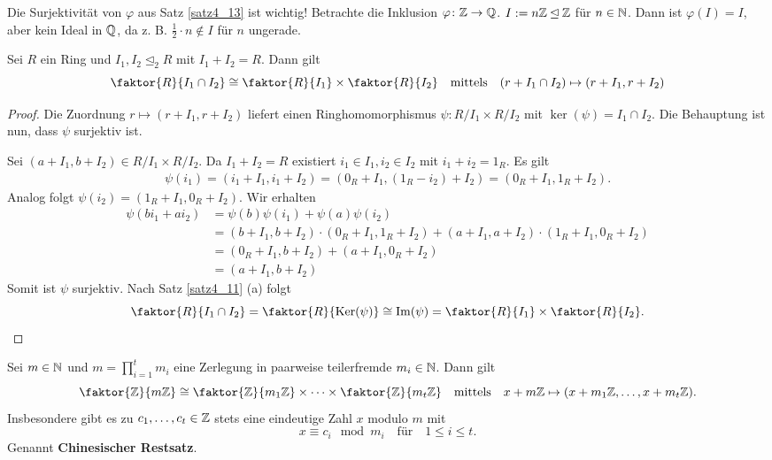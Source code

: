 \begin{rem}\label{rem4_14}
	Die Surjektivität von $\varphi$ aus Satz \ref{satz4_13} ist wichtig! Betrachte die Inklusion $\varphi \colon \mathbb{Z} \to \mathbb{Q}$. $I := n\mathbb{Z} \unlhd \mathbb{Z}$ für $n \in \mathbb{N}$. Dann ist $\varphi(I) = I$, aber kein Ideal in $\mathbb{Q}$, da z. B. $\frac{1}{2} \cdot n \notin I$ für $n$ ungerade.
\end{rem}

\begin{satz}\label{satz4_15}
	Sei $R$ ein Ring und $I_1, I_2 \unlhd_2 R$ mit $I_1 + I_2 = R$. Dann gilt
	\[\faktor{R}{I_1 \cap I_2} \cong \faktor{R}{I_1} \times \faktor{R}{I_2} \quad\text{mittels}\quad (r + I_1 \cap I_2) \mapsto (r+I_1, r+I_2)\]
\end{satz}
\begin{proof}
	Die Zuordnung $r \mapsto (r + I_1, r + I_2)$ liefert einen Ringhomomorphismus $\psi \colon R/I_1 \times R/I_2$ mit $\ker(\psi) = I_1 \cap I_2$. Die Behauptung ist nun, dass $\psi$ surjektiv ist.
	
	Sei $(a+I_1,b+I_2) \in R/I_1 \times R/I_2$. Da $I_1 + I_2 = R$ existiert $i_1 \in I_1, i_2 \in I_2$ mit $i_1 + i_2 = 1_R$. Es gilt
	\begin{align*}
		\psi(i_1) = (i_1 + I_1, i_1 + I_2) = (0_R + I_1, (1_R - i_2) + I_2) = (0_R + I_1, 1_R + I_2).
	\end{align*}
	Analog folgt $\psi(i_2) = (1_R + I_1, 0_R + I_2)$.  Wir erhalten
	\begin{align*}
		\psi(b{i_1} + a{i_2}) &= \psi(b)\psi(i_1) + \psi(a)\psi(i_2)\\ 
		&= (b+I_1, b+I_2)\cdot(0_R + I_1, 1_R + I_2) + (a+I_1, a + I_2)\cdot(1_R + I_1, 0_R +I_2)\\
		&= (0_R + I_1, b+I_2) + (a + I_1, 0_R + I_2) \\
		&= (a + I_1, b+I_2)
	\end{align*}
	Somit ist $\psi$ surjektiv. Nach Satz \ref{satz4_11} (a) folgt
	\[\faktor{R}{I_1 \cap I_2} = \faktor{R}{\ker(\psi)} \cong \im(\psi)  = \faktor{R}{I_1} \times \faktor{R}{I_2}.\]
\end{proof}
\begin{kor}\label{kor4_16}
	Sei $m \in \mathbb{N}$ und $m = \prod_{i=1}^t m_i$ eine Zerlegung in paarweise teilerfremde $m_i \in \mathbb{N}$. Dann gilt
	\[\faktor{\Z}{m\Z} \cong \faktor{\Z}{m_1 \Z} \times \dots \times \faktor{\Z}{m_t \Z} \quad\text{mittels}\quad x + m\Z \mapsto (x+m_1\Z, \dots, x+m_t \Z).\]
	Insbesondere gibt es zu $c_1, \dots, c_t \in \mathbb{Z}$ stets eine eindeutige Zahl $x$ modulo $m$ mit 
	\[x \equiv c_i \mod m_i \quad\text{für}\quad 1 \leq i \leq t.\]
	Genannt \textbf{Chinesischer Restsatz}.
\end{kor}
